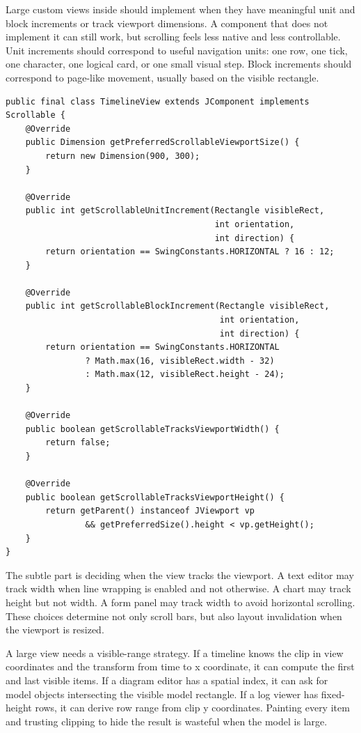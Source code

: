 Large custom views inside  should implement  when they have meaningful unit and block increments or track viewport dimensions. A component that does not implement it can still work, but scrolling feels less native and less controllable. Unit increments should correspond to useful navigation units: one row, one tick, one character, one logical card, or one small visual step. Block increments should correspond to page-like movement, usually based on the visible rectangle.

\begin{lstlisting}[caption={A sketch of Scrollable for a custom timeline view.}]
public final class TimelineView extends JComponent implements Scrollable {
    @Override
    public Dimension getPreferredScrollableViewportSize() {
        return new Dimension(900, 300);
    }

    @Override
    public int getScrollableUnitIncrement(Rectangle visibleRect,
                                          int orientation,
                                          int direction) {
        return orientation == SwingConstants.HORIZONTAL ? 16 : 12;
    }

    @Override
    public int getScrollableBlockIncrement(Rectangle visibleRect,
                                           int orientation,
                                           int direction) {
        return orientation == SwingConstants.HORIZONTAL
                ? Math.max(16, visibleRect.width - 32)
                : Math.max(12, visibleRect.height - 24);
    }

    @Override
    public boolean getScrollableTracksViewportWidth() {
        return false;
    }

    @Override
    public boolean getScrollableTracksViewportHeight() {
        return getParent() instanceof JViewport vp
                && getPreferredSize().height < vp.getHeight();
    }
}
\end{lstlisting}

The subtle part is deciding when the view tracks the viewport. A text editor may track width when line wrapping is enabled and not otherwise. A chart may track height but not width. A form panel may track width to avoid horizontal scrolling. These choices determine not only scroll bars, but also layout invalidation when the viewport is resized.

A large view needs a visible-range strategy. If a timeline knows the clip in view coordinates and the transform from time to x coordinate, it can compute the first and last visible items. If a diagram editor has a spatial index, it can ask for model objects intersecting the visible model rectangle. If a log viewer has fixed-height rows, it can derive row range from clip y coordinates. Painting every item and trusting clipping to hide the result is wasteful when the model is large.

